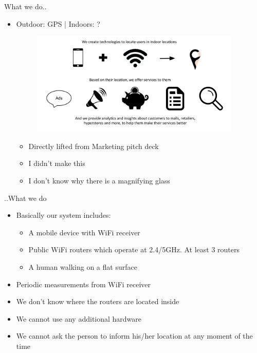 \documentclass{beamer}
\begin{document}

\begin{frame}{What we do..}
\begin{itemize}
  \item Outdoor: GPS  | Indoors: ?
  \begin{figure} [ht!]
    \includegraphics[width=100mm]{images/marketing_pitch.png}
  \end{figure}
  \begin{itemize}
    \item Directly lifted from Marketing pitch deck
    \item I didn't make this
    \item I don't know why there is a magnifying glass
   \end{itemize}
\end{itemize}
\vskip 1cm
\end{frame}
\begin{frame}{..What we do}
\begin{itemize}
  \item Basically our system includes:
  \begin{itemize}
    \item A mobile device with WiFi receiver
    \item Public WiFi routers which operate at 2.4/5GHz. At least 3 routers
    \item A human walking on a flat surface
  \end{itemize}
  \item Periodic measurements from WiFi receiver
  \item We don't know where the routers are located inside
  \item We cannot use any additional hardware
  \item We cannot ask the person to inform his/her location at any moment of the time
\end{itemize}
\vskip 1cm
\end{frame}
\end{document}
